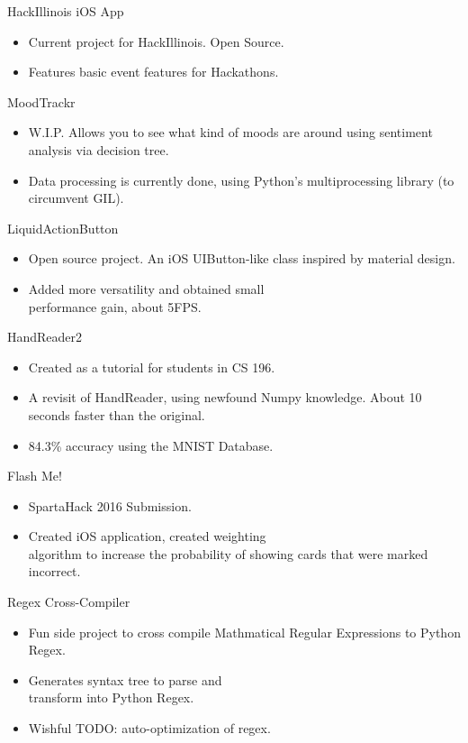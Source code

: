 \documentclass{tccv}
\begin{document}
\begin{projectlist}

  {HackIllinois iOS App}

  \begin{itemize}
  \item Current project for HackIllinois. Open Source.
  \item Features basic event features for Hackathons.
  \end{itemize}

  {MoodTrackr}
  \begin{itemize}
  \item W.I.P. Allows you to see what kind of moods are around using sentiment analysis via decision tree.
  \item Data processing is currently done, using Python's multiprocessing library (to circumvent GIL).
  \end{itemize}

  {LiquidActionButton}
  \begin{itemize}
  \item Open source project. An iOS UIButton-like class inspired by material design.
  \item Added more versatility and obtained small \\
    performance gain, about 5FPS.
  \end{itemize}

  {HandReader2}
  \begin{itemize}
  \item Created as a tutorial for students in CS 196.
  \item A revisit of HandReader, using newfound Numpy knowledge. About 10 seconds faster than the original.
  \item 84.3\% accuracy using the MNIST Database.
  \end{itemize}

  {Flash Me!}
  \begin{itemize}
  \item SpartaHack 2016 Submission.
  \item Created iOS application, created weighting \\
    algorithm to increase the probability of showing cards that were marked incorrect.
  \end{itemize}

  {Regex Cross-Compiler}
  \begin{itemize}
  \item Fun side project to cross compile Mathmatical Regular Expressions to Python Regex.
  \item Generates syntax tree to parse and \\
    transform into Python Regex.
  \item Wishful TODO: auto-optimization of regex.
  \end{itemize}

\end{projectlist}
\end{document}
